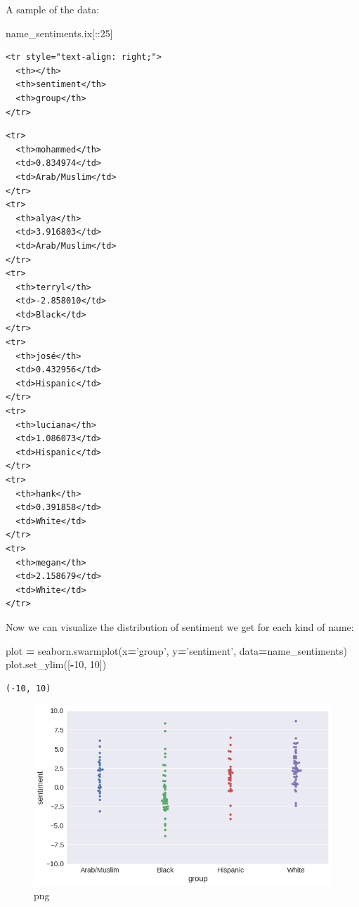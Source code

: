 \documentclass[]{book}
\newenvironment{Shaded}{\begin{snugshade}}{\end{snugshade}}
\newcommand{\DecValTok}[1]{\textcolor[rgb]{0.00,0.00,0.81}{#1}}
\newcommand{\StringTok}[1]{\textcolor[rgb]{0.31,0.60,0.02}{#1}}
\newcommand{\OperatorTok}[1]{\textcolor[rgb]{0.81,0.36,0.00}{\textbf{#1}}}
\newcommand{\NormalTok}[1]{#1}
\theoremstyle{definition}
\theoremstyle{definition}
\theoremstyle{definition}
\theoremstyle{remark}
\begin{document}
A sample of the data:

\begin{Shaded}
\begin{Highlighting}[]
\NormalTok{name_sentiments.ix[::}\DecValTok{25}\NormalTok{]}
\end{Highlighting}
\end{Shaded}

\begin{verbatim}
<tr style="text-align: right;">
  <th></th>
  <th>sentiment</th>
  <th>group</th>
</tr>
\end{verbatim}

\begin{verbatim}
<tr>
  <th>mohammed</th>
  <td>0.834974</td>
  <td>Arab/Muslim</td>
</tr>
<tr>
  <th>alya</th>
  <td>3.916803</td>
  <td>Arab/Muslim</td>
</tr>
<tr>
  <th>terryl</th>
  <td>-2.858010</td>
  <td>Black</td>
</tr>
<tr>
  <th>josé</th>
  <td>0.432956</td>
  <td>Hispanic</td>
</tr>
<tr>
  <th>luciana</th>
  <td>1.086073</td>
  <td>Hispanic</td>
</tr>
<tr>
  <th>hank</th>
  <td>0.391858</td>
  <td>White</td>
</tr>
<tr>
  <th>megan</th>
  <td>2.158679</td>
  <td>White</td>
</tr>
\end{verbatim}

Now we can visualize the distribution of sentiment we get for each kind
of name:

\begin{Shaded}
\begin{Highlighting}[]
\NormalTok{plot }\OperatorTok{=}\NormalTok{ seaborn.swarmplot(x}\OperatorTok{=}\StringTok{'group'}\NormalTok{, y}\OperatorTok{=}\StringTok{'sentiment'}\NormalTok{, data}\OperatorTok{=}\NormalTok{name_sentiments)}
\NormalTok{plot.set_ylim([}\OperatorTok{-}\DecValTok{10}\NormalTok{, }\DecValTok{10}\NormalTok{])}
\end{Highlighting}
\end{Shaded}

\begin{verbatim}
(-10, 10)
\end{verbatim}

\begin{figure}
\centering
\includegraphics{how-to-make-a-racist-ai-without-really-trying_files/how-to-make-a-racist-ai-without-really-trying_50_1.png}
\caption{png}
\end{figure}
\end{document}
